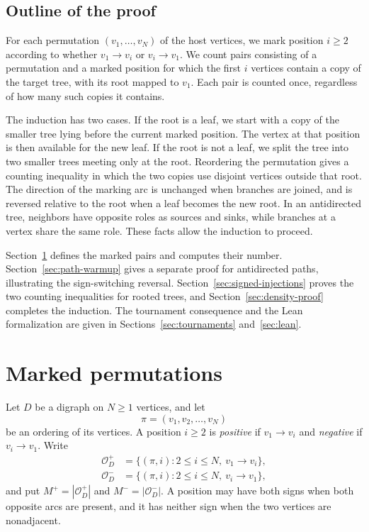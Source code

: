 \documentclass[11pt]{article}
\numberwithin{equation}{section}
\theoremstyle{definition}
\newcommand{\cO}{\mathcal O}
\begin{document}
\subsection{Outline of the proof}

For each permutation $(v_1,\ldots,v_N)$ of the host vertices, we mark
position $i\geq2$ according to whether $v_1\to v_i$ or $v_i\to v_1$.
We count pairs consisting of a permutation and a marked position for
which the first $i$ vertices contain a copy of the target tree, with
its root mapped to $v_1$.  Each pair is counted once, regardless of
how many such copies it contains.

The induction has two cases.  If the root is a leaf, we start with a
copy of the smaller tree lying before the current marked position.
The vertex at that position is then available for the new leaf.
If the root is not a leaf, we split the tree into two smaller trees
meeting only at the root.  Reordering the permutation gives a counting
inequality in which the two copies use disjoint vertices outside that
root.  The direction of the marking arc is unchanged when branches
are joined, and is reversed relative to the root when a leaf becomes
the new root.  In an antidirected tree, neighbors have opposite roles
as sources and sinks, while branches at a vertex share the same role.
These facts allow the induction to proceed.

Section~\ref{sec:marks} defines the marked pairs and computes their
number.  Section~\ref{sec:path-warmup} gives a separate proof for
antidirected paths, illustrating the sign-switching reversal.
Section~\ref{sec:signed-injections} proves the two counting inequalities
for rooted trees, and Section~\ref{sec:density-proof} completes the
induction.  The tournament consequence and the Lean formalization
are given in Sections~\ref{sec:tournaments} and~\ref{sec:lean}.

\section{Marked permutations}
\label{sec:marks}

Let $D$ be a digraph on $N\geq1$ vertices, and let
\[
        \pi=(v_1,v_2,\ldots,v_N)
\]
be an ordering of its vertices.  A position $i\geq2$ is \emph{positive} if
$v_1\to v_i$ and \emph{negative} if $v_i\to v_1$.  Write
\[
\begin{aligned}
 \cO_D^+
   &=\{(\pi,i):2\leq i\leq N,\ v_1\to v_i\},\\
 \cO_D^-
   &=\{(\pi,i):2\leq i\leq N,\ v_i\to v_1\},
\end{aligned}
\]
and put $M^+=|\cO_D^+|$ and $M^-=|\cO_D^-|$.
A position may have both signs when both opposite arcs are present, and it
has neither sign when the two vertices are nonadjacent.
\end{document}
